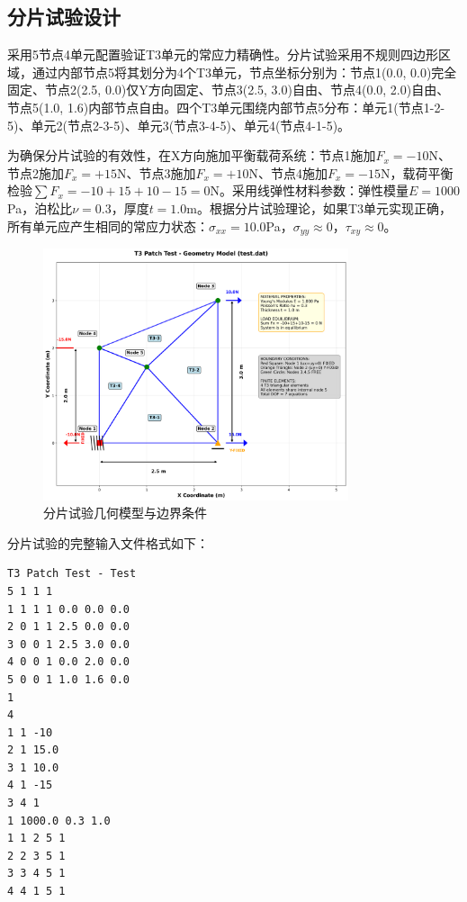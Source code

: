 \documentclass[12pt,a4paper]{article}
\begin{document}

\subsection{分片试验设计}

采用5节点4单元配置验证T3单元的常应力精确性。分片试验采用不规则四边形区域，通过内部节点5将其划分为4个T3单元，节点坐标分别为：节点1(0.0, 0.0)完全固定、节点2(2.5, 0.0)仅Y方向固定、节点3(2.5, 3.0)自由、节点4(0.0, 2.0)自由、节点5(1.0, 1.6)内部节点自由。四个T3单元围绕内部节点5分布：单元1(节点1-2-5)、单元2(节点2-3-5)、单元3(节点3-4-5)、单元4(节点4-1-5)。

为确保分片试验的有效性，在X方向施加平衡载荷系统：节点1施加$F_x = -10$N、节点2施加$F_x = +15$N、节点3施加$F_x = +10$N、节点4施加$F_x = -15$N，载荷平衡检验$\sum F_x = -10 + 15 + 10 - 15 = 0$N。采用线弹性材料参数：弹性模量$E = 1000$Pa，泊松比$\nu = 0.3$，厚度$t = 1.0$m。根据分片试验理论，如果T3单元实现正确，所有单元应产生相同的常应力状态：$\sigma_{xx} = 10.0$Pa，$\sigma_{yy} \approx 0$，$\tau_{xy} \approx 0$。

\begin{figure}[H]
\centering
\includegraphics[width=0.8\textwidth]{img/t3_patch_geometry.png}
\caption{分片试验几何模型与边界条件}
\label{fig:t3_patch_test}
\end{figure}

分片试验的完整输入文件格式如下：

\begin{lstlisting}[caption=分片试验输入文件]
T3 Patch Test - Test
5 1 1 1
1 1 1 1 0.0 0.0 0.0
2 0 1 1 2.5 0.0 0.0
3 0 0 1 2.5 3.0 0.0
4 0 0 1 0.0 2.0 0.0
5 0 0 1 1.0 1.6 0.0
1
4
1 1 -10
2 1 15.0
3 1 10.0
4 1 -15
3 4 1
1 1000.0 0.3 1.0
1 1 2 5 1
2 2 3 5 1
3 3 4 5 1
4 4 1 5 1
\end{lstlisting}
\end{document}

